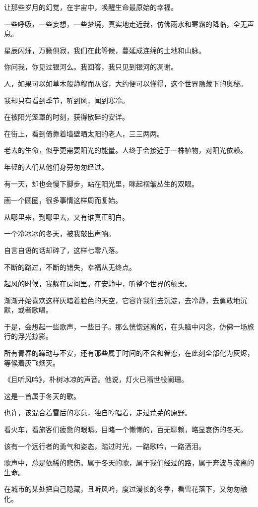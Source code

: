 		让那些岁月的幻觉，在宇宙中，唤醒生命最原始的幸福。\par
		一些呼吸，一些妄想，一些梦境，真实地走近我，仿佛雨水和寒霜的降临，全无声息。\par
		星辰闪烁，万籁俱寂，我们在此等候，蔓延成连绵的土地和山脉。\par
		你问我，你见过银河么。我回答，我只见到银河的凋谢。\par
		人，如果可以如草木般静穆而从容，大约便可以懂得，这个世界隐藏下的奥秘。\par
		我却只有看到季节，听到风，闻到寒冷。\par
		在被阳光笼罩的时刻，获得散碎的安详。\par
		在街上，看到倚靠着墙壁晒太阳的老人，三三两两。\par
		老去的生命，似乎更需要阳光的能量。人终于会接近于一株植物，对阳光依赖。\par
		年轻的人们从他们身旁匆匆经过。\par
		有一天，却也会慢下脚步，站在阳光里，眯起褶皱丛生的双眼。\par
		画一个圆圈，很多事情这样周而复始。\par
		从哪里来，到哪里去，又有谁真正明白。\par
		一个冷冰冰的冬天，被我敲出声响。\par
		自言自语的话却碎了，这样七零八落。

	\endwriting



		不断的路过，不断的错失，幸福从无终点。

		起风的时候，我躲在房间里。在安静中，听整个世界的颤栗。\par
		渐渐开始喜欢这样灰暗着脸色的天空，它容许我们去沉淀，去冷静，去勇敢地沉默，或者歌唱。

		于是，会想起一些歌声，一些日子。那么恍惚迷离的，在头脑中闪念，仿佛一场旅行的浮光掠影。\par
		所有青春的躁动与不安，还有那些属于时间的不舍和眷恋，在此刻全部化为灰烬，等候着灰飞烟灭。\par
		《且听风吟》，朴树冰凉的声音。他说，灯火已隔世般阑珊。\par
		这是一首属于冬天的歌。\par
		也许，该混合着雪后的寒意，独自哼唱着，走过荒芜的原野。\par
		看火车，看旅客们疲惫的眼睛。目睹一个懒懒的，百无聊赖，略显哀伤的冬天。\par
		该有一个远行者的勇气和姿态，踏过时光，一路歌吟，一路洒泪。\par
		歌声中，总是依稀的悲伤。属于冬天的歌，属于我们经过的路，属于奔波与流离的生命。\par
		在城市的某处把自己隐藏，且听风吟，度过漫长的冬季，看雪花落下，又匆匆融化。

